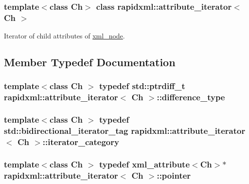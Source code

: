 \subsubsection*{template$<$class Ch$>$ class rapidxml::attribute\_\-iterator$<$ Ch $>$}

Iterator of child attributes of \hyperlink{classrapidxml_1_1xml__node}{xml\_\-node}. 

\subsection{Member Typedef Documentation}
\hypertarget{classrapidxml_1_1attribute__iterator_accfd6d8527d32b427496b42f71a2e37a}{
\subsubsection[{difference\_\-type}]{\setlength{\rightskip}{0pt plus 5cm}template$<$class Ch $>$ typedef std::ptrdiff\_\-t {\bf rapidxml::attribute\_\-iterator}$<$ Ch $>$::{\bf difference\_\-type}}}
\label{d7/d6a/classrapidxml_1_1attribute__iterator_accfd6d8527d32b427496b42f71a2e37a}
\hypertarget{classrapidxml_1_1attribute__iterator_a97ac5d8b98f5b03c68cc566f5ac0a9e0}{
\subsubsection[{iterator\_\-category}]{\setlength{\rightskip}{0pt plus 5cm}template$<$class Ch $>$ typedef std::bidirectional\_\-iterator\_\-tag {\bf rapidxml::attribute\_\-iterator}$<$ Ch $>$::{\bf iterator\_\-category}}}
\label{d7/d6a/classrapidxml_1_1attribute__iterator_a97ac5d8b98f5b03c68cc566f5ac0a9e0}
\hypertarget{classrapidxml_1_1attribute__iterator_a69acc2e60270d6a062c03c9cb1cf2aa7}{
\subsubsection[{pointer}]{\setlength{\rightskip}{0pt plus 5cm}template$<$class Ch $>$ typedef {\bf xml\_\-attribute}$<$Ch$>$$\ast$ {\bf rapidxml::attribute\_\-iterator}$<$ Ch $>$::{\bf pointer}}}
